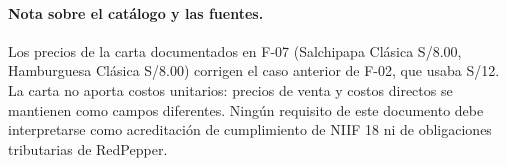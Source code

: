 \paragraph{Nota sobre el catálogo y las fuentes.} Los precios de la carta
documentados en F-07 (Salchipapa Clásica S/8.00, Hamburguesa Clásica
S/8.00) corrigen el caso anterior de F-02, que usaba S/12. La carta no
aporta costos unitarios: precios de venta y costos directos se mantienen
como campos diferentes. Ningún requisito de este documento debe
interpretarse como acreditación de cumplimiento de NIIF 18 ni de
obligaciones tributarias de RedPepper.
